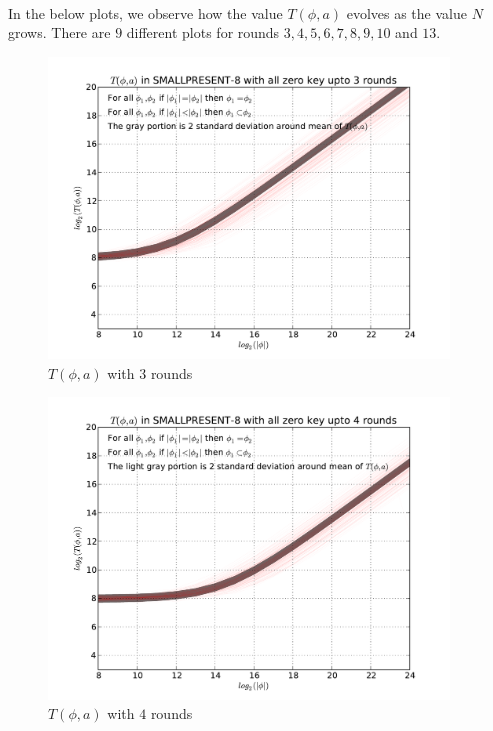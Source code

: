 \documentclass[9pt]{article}
\begin{document}
\paragraph*{} In the below plots, we observe how the value $T\left(\phi,a\right)$ evolves as the value $N$ grows. There are $9$ different plots for rounds $3,4,5,6,7,8,9,10$ and $13$. 

\begin{figure}[h!]
    \centering
    \includegraphics[width=\textwidth , height = 8cm]{T_a_phi_variable_a_varible_phi_variable_size_03rounds}
    \caption{$T(\phi,a)$ with $3$ rounds}
    \label{fig:T_a_phi_variable_a_varible_phi_variable_size_03rounds}
\end{figure}

\begin{figure}[h!]
    \centering
    \includegraphics[width=\textwidth , height = 8cm]{T_a_phi_variable_a_varible_phi_variable_size_04rounds}
    \caption{$T(\phi,a)$ with $4$ rounds}
    \label{fig:T_a_phi_variable_a_varible_phi_variable_size_04rounds}
\end{figure}
\end{document}
